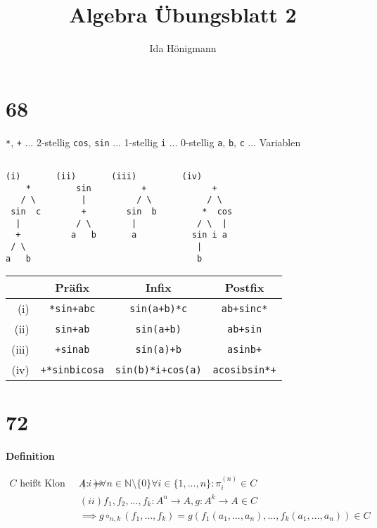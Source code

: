 \documentclass[]{article}
\title{Algebra Übungsblatt 2}
\author{Ida Hönigmann}
\begin{document}
\maketitle

\begin{abstract}

\end{abstract}

\newpage
\section{68}

\texttt{*}, \texttt{+} ... 2-stellig
\texttt{cos}, \texttt{sin} ... 1-stellig
\texttt{i} ... 0-stellig
\texttt{a}, \texttt{b}, \texttt{c} ... Variablen 

\begin{verbatim}
	
(i)       (ii)       (iii)         (iv)
    *         sin          +             +
   / \         |          / \           / \
 sin  c        +        sin  b         *  cos
  |           / \        |            / \  |
  +          a   b       a           sin i a
 / \                                  |
a   b                                 b
\end{verbatim}


\begin{tabular}{r|ccc}
		  & Präfix               & Infix                    & Postfix              \\\hline
	(i)   & \texttt{*sin+abc}    & \texttt{sin(a+b)*c}      & \texttt{ab+sinc*}    \\
	(ii)  & \texttt{sin+ab}      & \texttt{sin(a+b)}        & \texttt{ab+sin}      \\
	(iii) & \texttt{+sinab}      & \texttt{sin(a)+b}        & \texttt{asinb+}      \\
	(iv)  & \texttt{+*sinbicosa} & \texttt{sin(b)*i+cos(a)} & \texttt{acosibsin*+} \\
\end{tabular}


\newpage

\section{72}
\textbf{Definition}

\begin{align*}
	C \text{ heißt Klon auf } A :\iff & (i) \forall n \in \mathbb{N}\setminus\{0\} \forall i \in \{1, ..., n\}: \pi_i^{(n)} \in C \\
	& (ii) f_1,f_2,...,f_k:A^n\rightarrow A, g:A^k \rightarrow A \in C \\
	& \implies g\circ_{n,k}(f_1,...,f_k) = g(f_1(a_1,...,a_n),...,f_k(a_1,...,a_n)) \in C
\end{align*}
\end{document}

